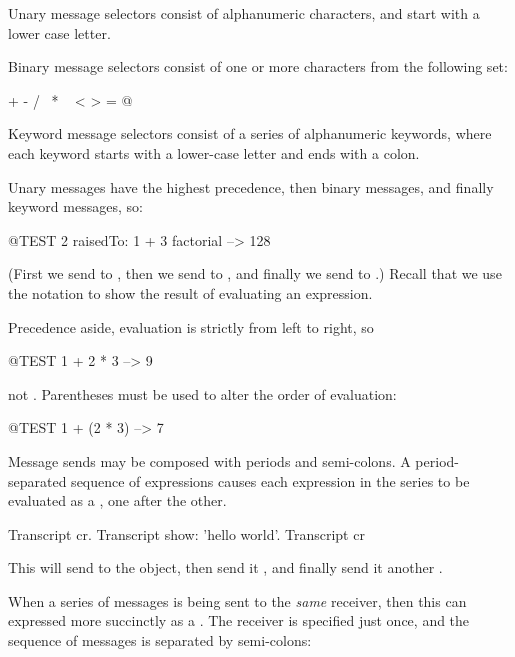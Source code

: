 \documentclass[a4paper,10pt,twoside]{book}
\begin{document}
Unary message selectors consist of alphanumeric characters, and start with a lower case letter.

Binary message selectors consist of one or more characters from the following set:
\begin{code}{}
+ - / \ * ~ < > = @ %
\end{code}
\noindent

Keyword message selectors consist of a series of alphanumeric keywords, where each keyword starts with a lower-case letter and ends with a colon.

Unary messages have the highest precedence, then binary messages, and finally keyword messages, so:
\begin{code}{@TEST}
2 raisedTo: 1 + 3 factorial --> 128
\end{code}
(First we send  to , then we send  to , and finally we send  to .)  
Recall that we use the notation \ct{-->} to show the result of evaluating an expression.

Precedence aside, evaluation is strictly from left to right, so
\begin{code}{@TEST}
1 + 2 * 3 --> 9
\end{code}
not .
Parentheses must be used to alter the order of evaluation:
\begin{code}{@TEST}
1 + (2 * 3) --> 7
\end{code}

Message sends may be composed with periods and semi-colons. A period-separated sequence of expressions causes each expression in the series to be evaluated as a , one after the other.

\begin{code}{}
Transcript cr.
Transcript show: 'hello world'.
Transcript cr
\end{code}

\noindent
This will send  to the  object, then send it , and finally send it another .

When a series of messages is being sent to the \emph{same} receiver, then this can expressed more succinctly as a .
The receiver is specified just once, and the sequence of messages is separated by semi-colons:
\end{document}

